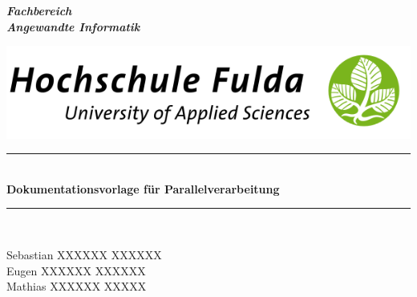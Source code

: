 	\graphicspath{{front/}}
\newcommand{\HRule}{\rule{\linewidth}{0.5mm}}
\begin{titlepage}
	\begin{minipage}{5cm}
	\vspace{-5mm}
  	\textsf{\textit{\textbf{Fachbereich\\
	Angewandte Informatik}}} %
	\end{minipage}

	\begin{minipage}{16.2cm}
		\vspace{-16mm}
		\begin{flushright}
	\includegraphics*[scale=.35]{hochschulefulda}
		\end{flushright}  	
	\end{minipage}

	\begin{center}
	\vspace{1.5cm}
	\HRule \\[0.4cm]
	{ \Large \bfseries Dokumentationsvorlage für Parallelverarbeitung\\[0.4cm]}
	\HRule \\[0.4cm]
	\vspace{2cm}
	\end{center}


	\vfill

	\begin{description}[style=multiline,leftmargin=2.5cm,font=\normalfont]
	\setlength{\itemsep}{-2pt}
		\item[\sffamily Vorgelegt von:] \sffamily Sebastian XXXXXX \hspace{.84cm} XXXXXX\\Eugen XXXXXX \hspace{1.5cm} XXXXXX\\Mathias XXXXXX \hspace{1.35cm} XXXXX
		\item[\sffamily :] \sffamily 
	\end{description}
\end{titlepage}